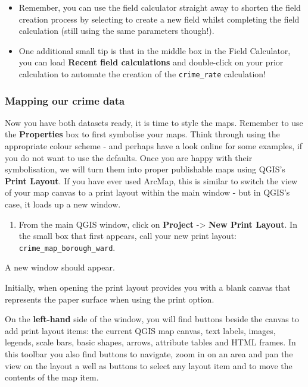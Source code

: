 \documentclass[
]{book}
\providecommand{\tightlist}{%
  \setlength{\itemsep}{0pt}\setlength{\parskip}{0pt}}
\begin{document}
\begin{itemize}
\item
  Remember, you can use the field calculator straight away to shorten the field creation process by selecting to create a new field whilst completing the field calculation (still using the same parameters though!).
\item
  One additional small tip is that in the middle box in the Field Calculator, you can load \textbf{Recent field calculations} and double-click on your prior calculation to automate the creation of the \texttt{crime\_rate} calculation!
\end{itemize}

\hypertarget{mapping-our-crime-data}{%
\subsubsection{Mapping our crime data}\label{mapping-our-crime-data}}

Now you have both datasets ready, it is time to style the maps. Remember to use the \textbf{Properties} box to first symbolise your maps. Think through using the appropriate colour scheme - and perhaps have a look online for some examples, if you do not want to use the defaults. Once you are happy with their symbolisation, we will turn them into proper publishable maps using QGIS's \textbf{Print Layout}. If you have ever used ArcMap, this is similar to switch the view of your map canvas to a print layout within the main window - but in QGIS's case, it loads up a new window.

\begin{enumerate}
\def\labelenumi{\arabic{enumi}.}
\tightlist
\item
  From the main QGIS window, click on \textbf{Project} -\textgreater{} \textbf{New Print Layout}. In the small box that first appears, call your new print layout: \texttt{crime\_map\_borough\_ward}.
\end{enumerate}

A new window should appear.

Initially, when opening the print layout provides you with a blank canvas that represents the paper surface when using the print option.

On the \textbf{left-hand} side of the window, you will find buttons beside the canvas to add print layout items: the current QGIS map canvas, text labels, images, legends, scale bars, basic shapes, arrows, attribute tables and HTML frames. In this toolbar you also find buttons to navigate, zoom in on an area and pan the view on the layout a well as buttons to select any layout item and to move the contents of the map item.
\end{document}
